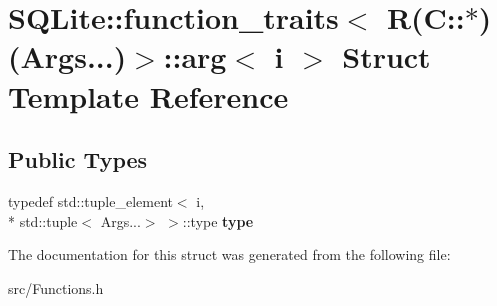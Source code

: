 \hypertarget{struct_s_q_lite_1_1function__traits_3_01_r_07_c_1_1_5_08_07_args_8_8_8_08_4_1_1arg}{\section{S\-Q\-Lite\-:\-:function\-\_\-traits$<$ R(C\-:\-:$\ast$)(Args...)$>$\-:\-:arg$<$ i $>$ Struct Template Reference}
\label{struct_s_q_lite_1_1function__traits_3_01_r_07_c_1_1_5_08_07_args_8_8_8_08_4_1_1arg}
}
\subsection*{Public Types}
\begin{DoxyCompactItemize}
\item 
\hypertarget{struct_s_q_lite_1_1function__traits_3_01_r_07_c_1_1_5_08_07_args_8_8_8_08_4_1_1arg_a514126a7a2361abdb9edcf202428c8b4}{typedef std\-::tuple\-\_\-element$<$ i, \\*
std\-::tuple$<$ Args...$>$ $>$\-::type {\bfseries type}}\label{struct_s_q_lite_1_1function__traits_3_01_r_07_c_1_1_5_08_07_args_8_8_8_08_4_1_1arg_a514126a7a2361abdb9edcf202428c8b4}

\end{DoxyCompactItemize}


The documentation for this struct was generated from the following file\-:\begin{DoxyCompactItemize}
\item 
src/Functions.\-h\end{DoxyCompactItemize}

